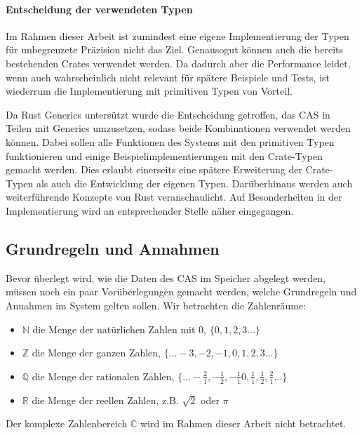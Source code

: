 \documentclass[11pt,a4paper, ngerman]{article}
\begin{document}
\paragraph{Entscheidung der verwendeten Typen} Im Rahmen dieser Arbeit ist zumindest eine eigene Implementierung der Typen für unbegrenzete Präzision nicht das Ziel. Genausogut können auch die bereits bestehenden Crates verwendet werden. Da dadurch aber die Performance leidet, wenn auch wahrscheinlich nicht relevant für spätere Beispiele und Tests, ist wiederrum die Implementierung mit primitiven Typen von Vorteil.

Da Rust Generics untersützt wurde die Entscheidung getroffen, das CAS in Teilen mit Generics umzusetzen, sodass beide Kombinationen verwendet werden können. Dabei sollen alle Funktionen des Systems mit den primitiven Typen funktionieren und einige Beispielimplementierungen mit den Crate-Typen gemacht werden. Dies erlaubt einerseits eine spätere Erweiterung der Crate-Typen als auch die Entwicklung der eigenen Typen. Darüberhinaus werden auch weiterführende Konzepte von Rust veranschaulicht. Auf Besonderheiten in der Implementierung wird an entsprechender Stelle näher eingegangen.

\subsection{Grundregeln und Annahmen}
Bevor überlegt wird, wie die Daten des CAS im Speicher abgelegt werden, müssen noch ein paar Vorüberlegungen gemacht werden, welche Grundregeln und Annahmen im System gelten sollen. Wir betrachten die Zahlenräume:
\begin{itemize}
    \item $\mathbb{N}$ die Menge der natürlichen Zahlen mit 0, $\{0, 1, 2, 3...\}$
    \item $\mathbb{Z}$ die Menge der ganzen Zahlen, $\{...-3, -2, -1, 0, 1, 2, 3...\}$
    \item $\mathbb{Q}$ die Menge der rationalen Zahlen, $\{...-\frac{2}{1}, -\frac{1}{2}, -\frac{1}{1} 0, \frac{1}{1}, \frac{1}{2}, \frac{2}{1}...\}$
    \item $\mathbb{R}$ die Menge der reellen Zahlen, z.B. $\sqrt{2}$ oder $\pi$
\end{itemize}

Der komplexe Zahlenbereich  $\mathbb{C}$ wird im Rahmen dieser Arbeit nicht betrachtet.
\end{document}
